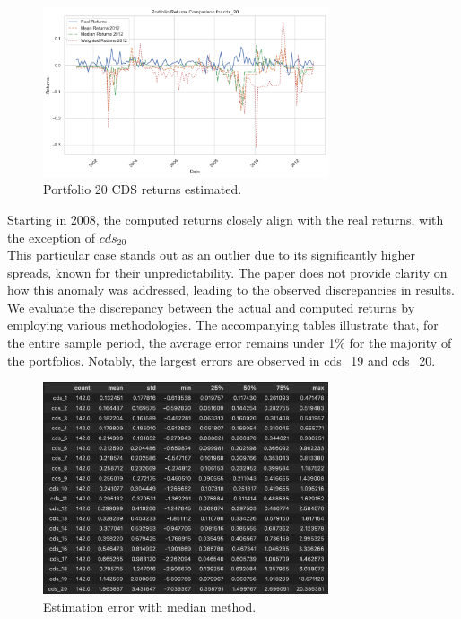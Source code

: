 \documentclass{article}
\begin{document}
\begin{Data science tools for finance final project}
\begin{figure}[H]
    \centering
    \includegraphics[width=0.75\textwidth]{../assets/returns_cds20_insample.png}
    \caption{\label{fig:myplot}Portfolio 20 CDS returns estimated.}
    \end{figure}   

Starting in 2008, the computed returns closely align with the real returns, with the exception of $cds_{20}$\\ 

This particular case stands out as an outlier due to its significantly higher spreads, known for their unpredictability. The paper does not provide clarity on how this anomaly was addressed, leading to the observed discrepancies in results.\\

We evaluate the discrepancy between the actual and computed returns by employing various methodologies. The accompanying tables illustrate that, for the entire sample period, the average error remains under 1\% for the majority of the portfolios. Notably, the largest errors are observed in cds_19 and cds_20.

\begin{figure}[H]
    \centering
    \includegraphics[width=0.75\textwidth]{../assets/Return difference_median method.png}
    \caption{\label{fig:myplot}Estimation error with median method.}
    \end{figure}          


\end{Data science tools for finance final project}
\end{document}
